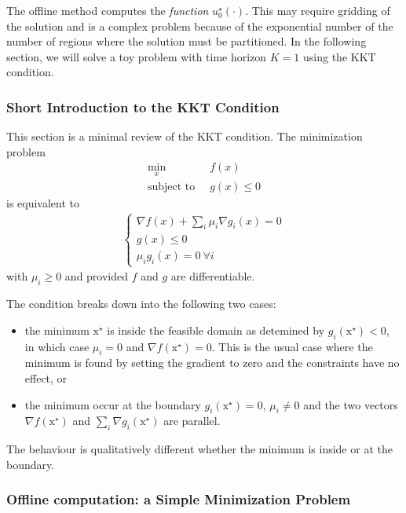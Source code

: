 \documentclass[11pt]{report}
\newcommand{\bs}[1]{\boldsymbol{#1}}
\newcommand{\bsx}{\bs{\mathrm{x}}}
\begin{document}
The offline method computes the \emph{function} $u_0^\star(\cdot)$. This may require gridding of the solution and is a complex problem because of the exponential number of the number of regions where the solution must be partitioned. In the following section, we will solve a toy problem with time horizon $K=1$ using the KKT condition.

\subsubsection{Short Introduction to the KKT Condition}
\label{sec:short-intro-KKT}

This section is a minimal review of the KKT condition. The minimization problem
\begin{align*}
  \min_x &\ f(x) \\
  \text{subject to } &\ g(x) \le 0
\end{align*}
is equivalent to
\begin{align*}
  \begin{cases}
    \nabla f(x) + \sum_i \mu_i \nabla g_i(x) = 0 \\
    g(x) \le 0 \\
    \mu_i g_i(x) = 0\ \forall i
  \end{cases}
\end{align*}
with $\mu_i\ge 0$ and provided $f$ and $g$ are differentiable.

The condition breaks down into the following two cases:
\begin{itemize}
\item the minimum $\bsx^\star$ is inside the feasible domain as   detemined by $g_i(\bsx^\star) < 0$, in which case $\mu_i=0$ and   $\nabla f(\bsx^\star) = 0$. This is the usual case where the minimum   is found by setting the gradient to zero and the constraints have no   effect, or
\item the minimum occur at the boundary $g_i(\bsx^\star) = 0$,   $\mu_i\neq 0$ and the two vectors $\nabla f(\bsx^\star)$ and   $\sum_i \nabla g_i(\bsx^\star)$ are parallel.
\end{itemize}
The behaviour is qualitatively different whether the minimum is inside or at the boundary.


\subsubsection{Offline computation: a Simple Minimization Problem}
\end{document}
